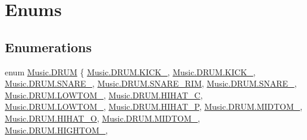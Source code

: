 \hypertarget{group___music_enums}{}\section{Enums}
\label{group___music_enums}
\subsection*{Enumerations}
\begin{DoxyCompactItemize}
\item 
enum \hyperlink{group___music_enums_gade475b4382c7066d1af13e7c13c029b6}{Music.\+D\+R\+UM} \{ \newline
\hyperlink{group___music_enums_ggade475b4382c7066d1af13e7c13c029b6a871b243e59015ac599015e9c5f8cfdaa}{Music.\+D\+R\+U\+M.\+K\+I\+C\+K\+\_}, 
\hyperlink{group___music_enums_ggade475b4382c7066d1af13e7c13c029b6add8ac581cd99ea05f540393daaba0be5}{Music.\+D\+R\+U\+M.\+K\+I\+C\+K\+\_}, 
\hyperlink{group___music_enums_ggade475b4382c7066d1af13e7c13c029b6a30d844bdad6320b2c056a8d37583b178}{Music.\+D\+R\+U\+M.\+S\+N\+A\+R\+E\+\_}, 
\hyperlink{group___music_enums_ggade475b4382c7066d1af13e7c13c029b6ac0944af51708424f9ecfcaf6b9ceb40b}{Music.\+D\+R\+U\+M.\+S\+N\+A\+R\+E\+\_\+\+R\+IM}, 
\hyperlink{group___music_enums_ggade475b4382c7066d1af13e7c13c029b6adf63db786582e77fbec3d22acfbb2c26}{Music.\+D\+R\+U\+M.\+S\+N\+A\+R\+E\+\_}, 
\hyperlink{group___music_enums_ggade475b4382c7066d1af13e7c13c029b6ab169d27f8ff1efb87d58da212b6bc25a}{Music.\+D\+R\+U\+M.\+L\+O\+W\+T\+O\+M\+\_}, 
\hyperlink{group___music_enums_ggade475b4382c7066d1af13e7c13c029b6aa19f835d81e001ed1084d75dcf79e9e1}{Music.\+D\+R\+U\+M.\+H\+I\+H\+A\+T\+\_\+C}, 
\hyperlink{group___music_enums_ggade475b4382c7066d1af13e7c13c029b6a427f3138018251643177388299d9b3d3}{Music.\+D\+R\+U\+M.\+L\+O\+W\+T\+O\+M\+\_}, 
\hyperlink{group___music_enums_ggade475b4382c7066d1af13e7c13c029b6a1f0a3efea7dc89dc7364d7ada15332c7}{Music.\+D\+R\+U\+M.\+H\+I\+H\+A\+T\+\_\+P}, 
\hyperlink{group___music_enums_ggade475b4382c7066d1af13e7c13c029b6a7cfe02c9cff874222e8e298e78338181}{Music.\+D\+R\+U\+M.\+M\+I\+D\+T\+O\+M\+\_}, 
\hyperlink{group___music_enums_ggade475b4382c7066d1af13e7c13c029b6a5da9560603e1755c936289eda0c9d46b}{Music.\+D\+R\+U\+M.\+H\+I\+H\+A\+T\+\_\+O}, 
\hyperlink{group___music_enums_ggade475b4382c7066d1af13e7c13c029b6ae24e4cd397daacac51069cb4209d075c}{Music.\+D\+R\+U\+M.\+M\+I\+D\+T\+O\+M\+\_}, 
\newline
\hyperlink{group___music_enums_ggade475b4382c7066d1af13e7c13c029b6a5542bef9b7c7387048a53df9c956815b}{Music.\+D\+R\+U\+M.\+H\+I\+G\+H\+T\+O\+M\+\_}, 

\end{DoxyCompactItemize}
